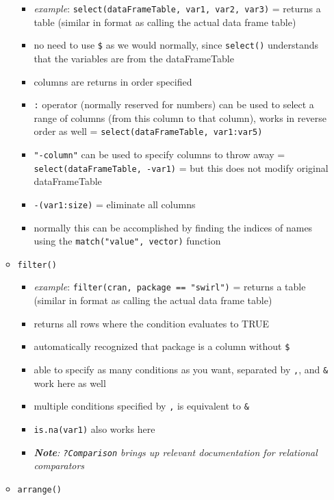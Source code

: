 \documentclass[
]{article}
\providecommand{\tightlist}{%
  \setlength{\itemsep}{0pt}\setlength{\parskip}{0pt}}
\begin{document}
\begin{itemize}
\begin{itemize}
    \begin{itemize}
    \tightlist
    \item
      \emph{example}:
      \texttt{select(dataFrameTable,\ var1,\ var2,\ var3)} = returns a
      table (similar in format as calling the actual data frame table)
    \item
      no need to use \texttt{\$} as we would normally, since
      \texttt{select()} understands that the variables are from the
      dataFrameTable
    \item
      columns are returns in order specified
    \item
      \texttt{:} operator (normally reserved for numbers) can be used to
      select a range of columns (from this column to that column), works
      in reverse order as well =
      \texttt{select(dataFrameTable,\ var1:var5)}
    \item
      \texttt{"-column"} can be used to specify columns to throw away =
      \texttt{select(dataFrameTable,\ -var1)} = but this does not modify
      original dataFrameTable
    \item
      \texttt{-(var1:size)} = eliminate all columns
    \item
      normally this can be accomplished by finding the indices of names
      using the \texttt{match("value",\ vector)} function
    \end{itemize}
  \item
    \texttt{filter()}

    \begin{itemize}
    \tightlist
    \item
      \emph{example}: \texttt{filter(cran,\ package\ ==\ "swirl")} =
      returns a table (similar in format as calling the actual data
      frame table)
    \item
      returns all rows where the condition evaluates to TRUE
    \item
      automatically recognized that package is a column without
      \texttt{\$}
    \item
      able to specify as many conditions as you want, separated by
      \texttt{,}, \texttt{\textbar{}} and \texttt{\&} work here as well
    \item
      multiple conditions specified by \texttt{,} is equivalent to
      \texttt{\&}
    \item
      \texttt{is.na(var1)} also works here
    \item
      \emph{\textbf{Note}: \texttt{?Comparison} brings up relevant
      documentation for relational comparators }
    \end{itemize}
  \item
    \texttt{arrange()}


\end{itemize}
\end{itemize}
\end{document}
